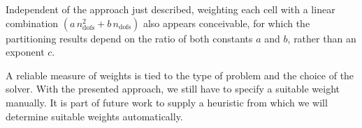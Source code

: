 Independent of the approach just described, weighting each cell with a linear combination $(a \, n_\text{dofs}^2 + b \, n_\text{dofs})$ also appears conceivable, for which the partitioning results depend on the ratio of both constants $a$ and $b$, rather than an exponent $c$.


A reliable measure of weights is tied to the type of problem and the choice of the solver. With the presented approach, we still have to specify a suitable weight manually. It is part of future work to supply a heuristic from which we will determine suitable weights automatically. %